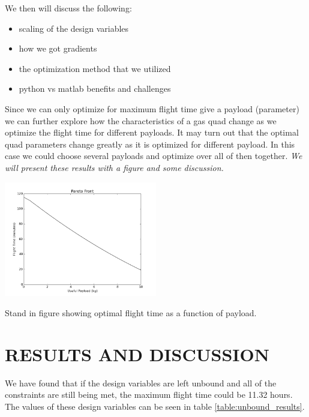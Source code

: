 \documentclass[letterpaper, 10 pt, conference]{ieeeconf}  %
\makeatletter
\newenvironment{figurehere}
  {\def\@captype{figure}}
  {}
\makeatother
\begin{document}
We then will discuss the following:
\begin{itemize}
	\item{scaling of the design variables}
	\item{how we got gradients}
	\item{the optimization method that we utilized}
	\item{python vs matlab benefits and challenges}
\end{itemize}

Since we can only optimize for maximum flight time give a payload (parameter) we can further explore how the characteristics of a gas quad change as we optimize the flight time for different payloads. It may turn out that the optimal quad parameters change greatly as it is optimized for different payload.  In this case we could choose several payloads and optimize over all of then together. \textit{We will present these results with a figure and some discussion.}

\begin{figurehere}
	\includegraphics[width=0.5\textwidth]{pareto_front.png}
	\caption{Stand in figure showing optimal flight time as a function of payload.}
		\label{fig:payload}
\end{figurehere}


\section{RESULTS AND DISCUSSION}

We have found that if the design variables are left unbound and all of the constraints are still being met, the maximum flight time could be 11.32 hours. The values of these design variables can be seen in table \ref{table:unbound_results}. 
\end{document}
